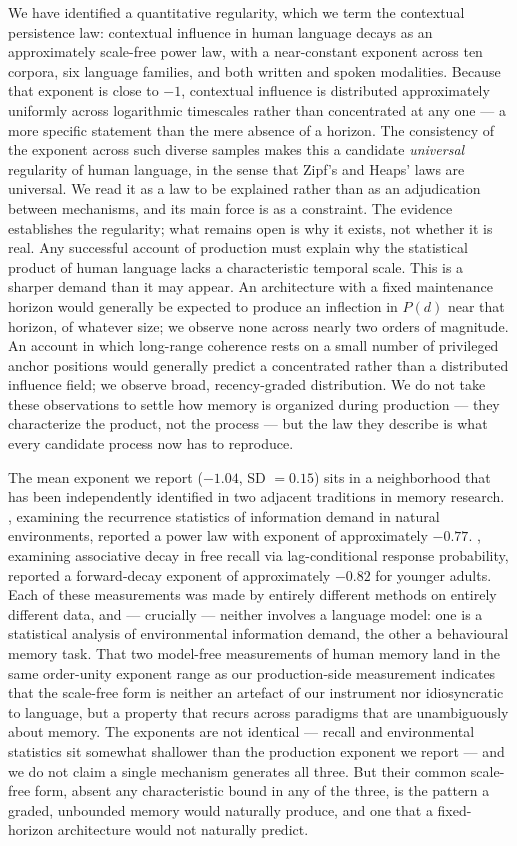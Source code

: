 \documentclass[11pt]{article}
\begin{document}
We have identified a quantitative regularity, which we term the
contextual persistence law: contextual influence in human language decays as an approximately
scale-free power law, with a near-constant exponent across ten corpora, six language families,
and both written and spoken modalities. Because that exponent is close to $-1$, contextual
influence is distributed approximately uniformly across logarithmic timescales rather than
concentrated at any one --- a more specific statement than the mere absence of a horizon. The
consistency of the exponent across such diverse samples makes this a candidate \emph{universal}
regularity of human language, in the sense that Zipf's and Heaps' laws are universal. We read it
as a law to be explained rather than as an adjudication between mechanisms, and its main force is
as a constraint. The evidence establishes the regularity; what remains open is why it exists, not
whether it is real. Any successful account of production must explain why the statistical product of
human language lacks a characteristic temporal scale. This is a sharper demand than it may
appear. An architecture with a fixed maintenance horizon would generally be expected to
produce an inflection in $P(d)$ near that horizon, of whatever size; we observe none across
nearly two orders of magnitude. An account in which long-range coherence rests on a small
number of privileged anchor positions would generally predict a concentrated rather than a
distributed influence field; we observe broad, recency-graded distribution. We do not take
these observations to settle how memory is organized during production --- they characterize
the product, not the process --- but the law they describe is what every candidate process
now has to reproduce.

The mean exponent we report ($-1.04$, SD $=0.15$) sits in a neighborhood that has been
independently identified in two adjacent traditions in memory research.
\citet{anderson1991reflections}, examining the recurrence statistics of information demand
in natural environments, reported a power law with exponent of approximately $-0.77$.
\citet{kahana2002age}, examining associative decay in free recall via lag-conditional
response probability, reported a forward-decay exponent of approximately $-0.82$ for
younger adults. Each of these measurements was made by entirely different methods on
entirely different data, and --- crucially --- neither involves a language model: one is a
statistical analysis of environmental information demand, the other a behavioural memory
task. That two model-free measurements of human memory land in the same order-unity exponent
range as our production-side measurement indicates that the scale-free form is neither an
artefact of our instrument nor idiosyncratic to language, but a property that recurs across
paradigms that are unambiguously about memory. The exponents are not identical --- recall and
environmental statistics sit somewhat shallower than the production exponent we report --- and
we do not claim a single mechanism generates all three. But their common scale-free form, absent
any characteristic bound in any of the three, is the pattern a graded, unbounded memory would
naturally produce, and one that a fixed-horizon architecture would not naturally predict.
\end{document}
